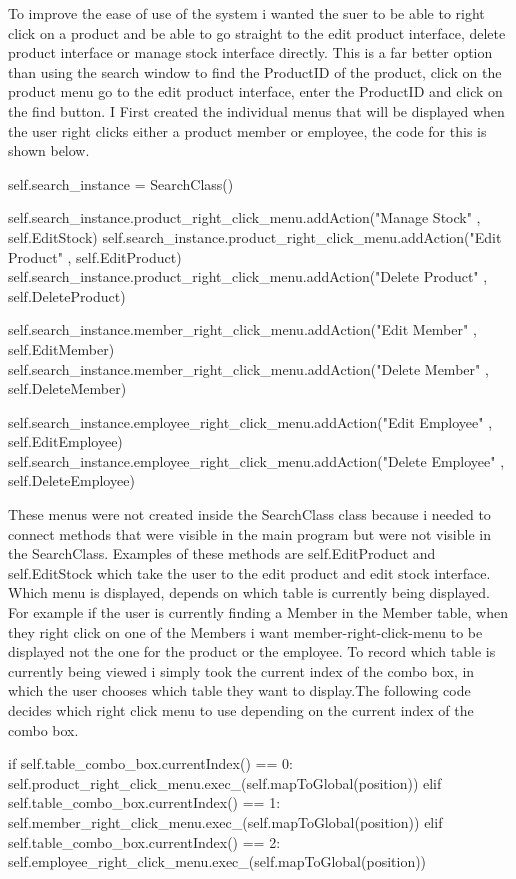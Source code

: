 To improve the ease of use of the system i wanted the suer to be able to right click on a product and be able to go straight to the edit product interface, delete product interface or manage stock interface directly. This is a far better option than using the search window to find the ProductID of the product, click on the product menu go to the edit product interface, enter the ProductID and click on the find button. I First created the individual menus that will be displayed when the user right clicks either a product member or employee, the code for this is shown below.

\begin{python}

self.search_instance = SearchClass()
        
self.search_instance.product_right_click_menu.addAction("Manage Stock" , self.EditStock)
self.search_instance.product_right_click_menu.addAction("Edit Product" , self.EditProduct)
self.search_instance.product_right_click_menu.addAction("Delete Product" , self.DeleteProduct)

self.search_instance.member_right_click_menu.addAction("Edit Member" , self.EditMember)
self.search_instance.member_right_click_menu.addAction("Delete Member" , self.DeleteMember)

self.search_instance.employee_right_click_menu.addAction("Edit Employee" , self.EditEmployee)
self.search_instance.employee_right_click_menu.addAction("Delete Employee" , self.DeleteEmployee)

These menus were not created inside the SearchClass class because i needed to connect methods that were visible in the main program but were not visible in the SearchClass. Examples of these methods are self.EditProduct and self.EditStock which take the user to the edit product and edit stock interface. Which menu is displayed, depends on which table is currently being displayed. For example if the user is currently finding a Member in the Member table, when they right click on one of the Members i want member-right-click-menu to be displayed not the one for the product or the employee. To record which table is currently being viewed i simply took the current index of the combo box, in which the user chooses which table they want to display.The following code decides which right click menu to use depending on the current index of the combo box.

\begin{python}
 if self.table_combo_box.currentIndex() == 0:
	 self.product_right_click_menu.exec_(self.mapToGlobal(position))
 elif self.table_combo_box.currentIndex() == 1:
	self.member_right_click_menu.exec_(self.mapToGlobal(position))
elif self.table_combo_box.currentIndex() == 2:
	self.employee_right_click_menu.exec_(self.mapToGlobal(position))
\end{python}


\end{python}

